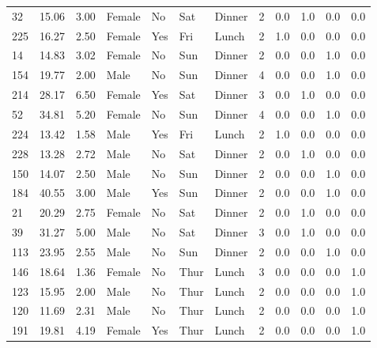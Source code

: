 \documentclass[
  letterpaper,
  DIV=11,
  numbers=noendperiod]{scrreprt}
\begin{document}
\begin{tabular}{lrrllllrrrrr}
32  &       15.06 &  3.00 &  Female &     No &   Sat &  Dinner &     2 &      0.0 &      1.0 &      0.0 &       0.0 \\
225 &       16.27 &  2.50 &  Female &    Yes &   Fri &   Lunch &     2 &      1.0 &      0.0 &      0.0 &       0.0 \\
14  &       14.83 &  3.02 &  Female &     No &   Sun &  Dinner &     2 &      0.0 &      0.0 &      1.0 &       0.0 \\
154 &       19.77 &  2.00 &    Male &     No &   Sun &  Dinner &     4 &      0.0 &      0.0 &      1.0 &       0.0 \\
214 &       28.17 &  6.50 &  Female &    Yes &   Sat &  Dinner &     3 &      0.0 &      1.0 &      0.0 &       0.0 \\
52  &       34.81 &  5.20 &  Female &     No &   Sun &  Dinner &     4 &      0.0 &      0.0 &      1.0 &       0.0 \\
224 &       13.42 &  1.58 &    Male &    Yes &   Fri &   Lunch &     2 &      1.0 &      0.0 &      0.0 &       0.0 \\
228 &       13.28 &  2.72 &    Male &     No &   Sat &  Dinner &     2 &      0.0 &      1.0 &      0.0 &       0.0 \\
150 &       14.07 &  2.50 &    Male &     No &   Sun &  Dinner &     2 &      0.0 &      0.0 &      1.0 &       0.0 \\
184 &       40.55 &  3.00 &    Male &    Yes &   Sun &  Dinner &     2 &      0.0 &      0.0 &      1.0 &       0.0 \\
21  &       20.29 &  2.75 &  Female &     No &   Sat &  Dinner &     2 &      0.0 &      1.0 &      0.0 &       0.0 \\
39  &       31.27 &  5.00 &    Male &     No &   Sat &  Dinner &     3 &      0.0 &      1.0 &      0.0 &       0.0 \\
113 &       23.95 &  2.55 &    Male &     No &   Sun &  Dinner &     2 &      0.0 &      0.0 &      1.0 &       0.0 \\
146 &       18.64 &  1.36 &  Female &     No &  Thur &   Lunch &     3 &      0.0 &      0.0 &      0.0 &       1.0 \\
123 &       15.95 &  2.00 &    Male &     No &  Thur &   Lunch &     2 &      0.0 &      0.0 &      0.0 &       1.0 \\
120 &       11.69 &  2.31 &    Male &     No &  Thur &   Lunch &     2 &      0.0 &      0.0 &      0.0 &       1.0 \\
191 &       19.81 &  4.19 &  Female &    Yes &  Thur &   Lunch &     2 &      0.0 &      0.0 &      0.0 &       1.0 \\

\end{tabular}
\end{document}
